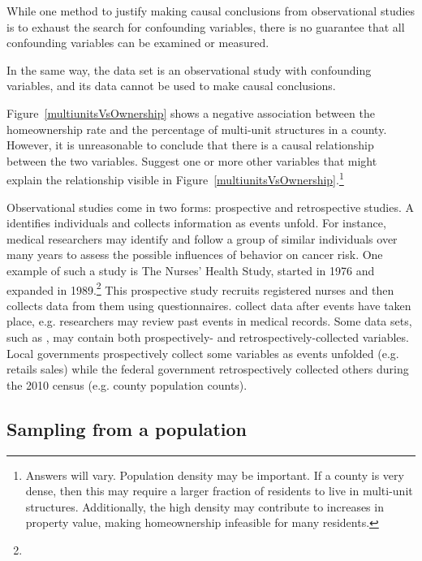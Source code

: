 While one method to justify making causal conclusions from observational studies is to exhaust the search for confounding variables, there is no guarantee that all confounding variables can be examined or measured.

In the same way, the  data set is an observational study with confounding variables, and its data cannot be used to make causal conclusions.

\begin{exercise}
Figure~\ref{multiunitsVsOwnership} shows a negative association between the homeownership rate and the percentage of multi-unit structures in a county. However, it is unreasonable to conclude that there is a causal relationship between the two variables. Suggest one or more other variables that might explain the relationship visible in Figure~\ref{multiunitsVsOwnership}.\footnote{Answers will vary. Population density may be important. If a county is very dense, then this may require a larger fraction of residents to live in multi-unit structures. Additionally, the high density may contribute to increases in property value, making homeownership infeasible for many residents.}
\end{exercise}

Observational studies come in two forms: prospective and retrospective studies. A  identifies individuals and collects information as events unfold. For instance, medical researchers may identify and follow a group of similar individuals over many years to assess the possible influences of behavior on cancer risk. One example of such a study is The Nurses' Health Study, started in 1976 and expanded in 1989.\footnote{} This prospective study recruits registered nurses and then collects data from them using questionnaires.  collect data after events have taken place, e.g. researchers may review past events in medical records. Some data sets, such as , may contain both prospectively- and retrospectively-collected variables. Local governments prospectively collect some variables as events unfolded (e.g. retails sales) while the federal government retrospectively collected others during the 2010 census (e.g. county population counts).


\subsection{Sampling from a population}

